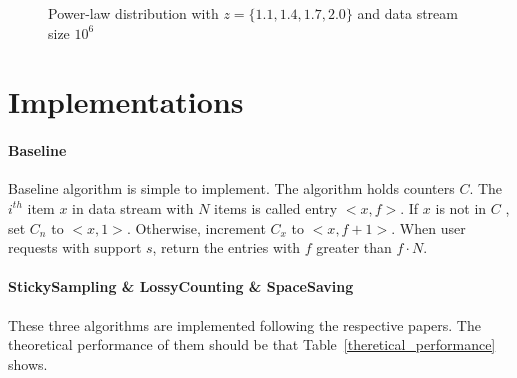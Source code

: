 \documentclass[10pt]{article}
\begin{document}
\begin{figure}
     \begin{subfigure}[b]{0.5\textwidth}
          \centering
          \label{power-law-z-1.1-100-stream-1000000}
    \end{subfigure}
    \begin{subfigure}[b]{0.5\textwidth}
          \centering
          \label{power-law-z-1.4-100-stream-1000000}
    \end{subfigure}
    \begin{subfigure}[b]{0.5\textwidth}
          \centering
          \label{power-law-z-1.7-100-stream-1000000}
    \end{subfigure}
    \begin{subfigure}[b]{0.5\textwidth}
          \centering
          \label{power-law-z-2.0-100-stream-1000000}
    \end{subfigure}
 
    \caption{Power-law distribution with $z = \{1.1, 1.4, 1.7, 2.0\}$ and data stream size $10^6$}
    \label{power-law}
\end{figure}

\section{Implementations}
\paragraph{Baseline}
Baseline algorithm is simple to implement. The algorithm holds counters $C$.
The $i^{th}$ item $x$ in data stream with $N$ items is called entry $<x, f>$. 
If $x$ is not in $C$ , set $C_n$ to $<x, 1>$. Otherwise, increment $C_x$ to $<x, f+1>$.
When user requests with support $s$, return the entries with $f$ greater than $f\cdot{}N$.
\paragraph{StickySampling \& LossyCounting \& SpaceSaving}
These three algorithms are implemented following the respective papers.
The theoretical performance of them should be that Table~\ref{theretical_performance} shows.
\end{document}
